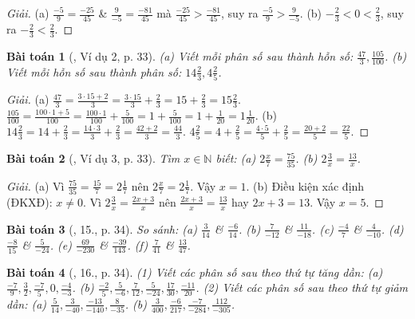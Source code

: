 \documentclass{article}
\newtheorem{baitoan}{Bài toán}
\begin{document}
\begin{proof}[Giải]
	(a) $\frac{-5}{9} = \frac{-25}{45}$ \& $\frac{9}{-5} = \frac{-81}{45}$ mà $\frac{-25}{45} > \frac{-81}{45}$, suy ra $\frac{-5}{9} > \frac{9}{-5}$. (b) $-\frac{2}{3} < 0 < \frac{2}{3}$, suy ra $-\frac{2}{3} < \frac{2}{3}$.
\end{proof}

\begin{baitoan}[\cite{SBT_Toan_6_Canh_Dieu_tap_2}, Ví dụ 2, p. 33]
	(a) Viết mỗi phân số sau thành hỗn số: $\frac{47}{3},\frac{105}{100}$. (b) Viết mỗi hỗn số sau thành phân số: $14\frac{2}{3},4\frac{2}{5}$.
\end{baitoan}

\begin{proof}[Giải]
	(a) $\frac{47}{3} = \frac{3\cdot15 + 2}{3} = \frac{3\cdot15}{3} + \frac{2}{3} = 15 + \frac{2}{3} = 15\frac{2}{3}$. $\frac{105}{100} = \frac{100\cdot1  + 5}{100} = \frac{100\cdot1}{100} + \frac{5}{100} = 1 + \frac{5}{100} = 1 + \frac{1}{20} = 1\frac{1}{20}$. (b)  $14\frac{2}{3} = 14 + \frac{2}{3} = \frac{14\cdot3}{3} + \frac{2}{3} = \frac{42 + 2}{3} = \frac{44}{3}$. $4\frac{2}{5} = 4 + \frac{2}{5} = \frac{4\cdot5}{5} + \frac{2}{5} = \frac{20 + 2}{5} = \frac{22}{5}$.
\end{proof}

\begin{baitoan}[\cite{SBT_Toan_6_Canh_Dieu_tap_2}, Ví dụ 3, p. 33]
	Tìm $x\in\mathbb{N}$ biết: (a) $2\frac{x}{7} = \frac{75}{35}$. (b) $2\frac{3}{x} = \frac{13}{x}$.
\end{baitoan}

\begin{proof}[Giải]
	(a) Vì $\frac{75}{35} = \frac{15}{7} = 2\frac{1}{7}$ nên $2\frac{x}{7} = 2\frac{1}{7}$. Vậy $x = 1$. (b) Điều kiện xác định (ĐKXĐ): $x\ne0$. Vì $2\frac{3}{x} = \frac{2x + 3}{x}$ nên $\frac{2x + 3}{x} = \frac{13}{x}$ hay $2x + 3 = 13$. Vậy $x = 5$.
\end{proof}

\begin{baitoan}[\cite{SBT_Toan_6_Canh_Dieu_tap_2}, 15., p. 34]
	So sánh: (a) $\frac{3}{14}$ \& $\frac{-6}{14}$. (b) $\frac{7}{-12}$ \& $\frac{11}{-18}$. (c) $\frac{-4}{7}$ \& $\frac{4}{-10}$. (d) $\frac{-8}{15}$ \& $\frac{5}{-24}$. (e) $\frac{69}{-230}$ \& $\frac{-39}{143}$. (f) $\frac{7}{41}$ \& $\frac{13}{47}$.
\end{baitoan}

\begin{baitoan}[\cite{SBT_Toan_6_Canh_Dieu_tap_2}, 16., p. 34]
	 (1) Viết các phân số sau theo thứ tự tăng dần: (a) $\frac{-7}{9},\frac{3}{2},\frac{-7}{5},0,\frac{-4}{-3}$. (b) $\frac{-2}{5},\frac{5}{-6},\frac{7}{12},\frac{5}{-24},\frac{17}{30},\frac{-11}{20}$. (2) Viết các phân số sau theo thứ tự giảm dần: (a) $\frac{5}{14},\frac{3}{-40},\frac{-13}{-140},\frac{8}{-35}$. (b) $\frac{3}{400},\frac{-6}{217},\frac{-7}{-284},\frac{112}{-305}$.
\end{baitoan}
\end{document}
